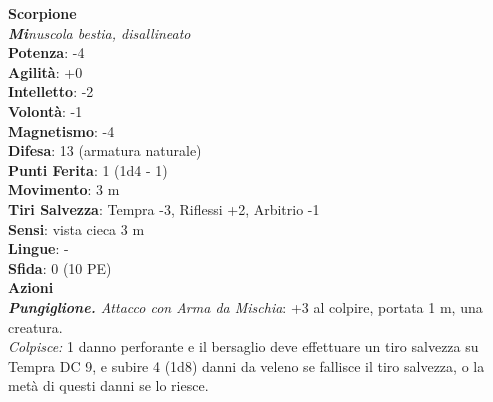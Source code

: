 \begin{multicols}{2}
\medskip\textbf{Scorpione}\\
\emph{\textbf{Mi}nuscola bestia, disallineato}\\
\textbf{Potenza}: -4\\
\textbf{Agilità}: +0\\
\textbf{Intelletto}: -2\\
\textbf{Volontà}: -1\\
\textbf{Magnetismo}: -4\\
\textbf{Difesa}: 13 (armatura naturale)\\
\textbf{Punti Ferita}: 1 (1d4 - 1)\\
\textbf{Movimento}: 3 m\\
\textbf{Tiri Salvezza}: Tempra -3, Riflessi +2, Arbitrio -1\\
\textbf{Sensi}: vista cieca 3 m\\
\textbf{Lingue}: -\\
\textbf{Sfida}: 0 (10 PE)\smallskip\\
\smallskip\textbf{Azioni}\\
\emph{\textbf{Pungiglione.} Attacco con Arma da Mischia}: +3 al colpire, portata 1 m, una creatura.\\
\emph{Colpisce:} 1 danno perforante e il bersaglio deve effettuare un tiro salvezza su Tempra DC 9, e subire 4 (1d8) danni da veleno se fallisce il tiro salvezza, o la metà di questi danni se lo riesce.\\


\end{multicols}
